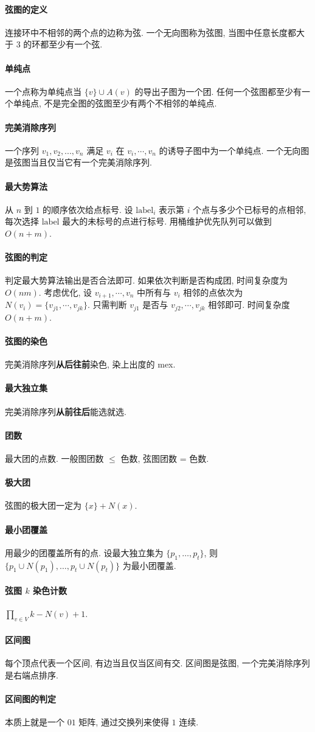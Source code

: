 \paragraph{弦图的定义}连接环中不相邻的两个点的边称为弦. 一个无向图称为弦图, 当图中任意长度都大于 $3$ 的环都至少有一个弦.
\paragraph{单纯点}一个点称为单纯点当 $\{v\}\cup A(v)$ 的导出子图为一个团. 任何一个弦图都至少有一个单纯点, 不是完全图的弦图至少有两个不相邻的单纯点. 
\paragraph{完美消除序列}一个序列 ${v_1,v_2,...,v_n}$ 满足 $v_i$ 在 ${v_i,\cdots,v_n}$ 的诱导子图中为一个单纯点.
一个无向图是弦图当且仅当它有一个完美消除序列.
\paragraph{最大势算法} 从 $n$ 到 $1$ 的顺序依次给点标号. 设 $\mathrm{label}_i$ 表示第 $i$ 个点与多少个已标号的点相邻, 每次选择 $\mathrm{label}$ 最大的未标号的点进行标号. 用桶维护优先队列可以做到 $O(n + m)$. 
\paragraph{弦图的判定} 判定最大势算法输出是否合法即可. 如果依次判断是否构成团, 时间复杂度为 $O(nm)$.
考虑优化, 设 ${v_{i+1},\cdots,v_n}$ 中所有与 $v_i$ 相邻的点依次为 $N(v_i) = \{v_{j1},\cdots,v_{jk}\}$. 
只需判断 $v_{j1}$ 是否与 $v_{j2},\cdots,v_{jk}$ 相邻即可. 时间复杂度$O(n+m)$.
\paragraph{弦图的染色} 完美消除序列\textbf{从后往前}染色, 染上出度的 mex.
\paragraph{最大独立集} 完美消除序列\textbf{从前往后}能选就选.
\paragraph{团数} 最大团的点数. 一般图团数 $\leq$ 色数, 弦图团数 = 色数. 
\paragraph{极大团} 弦图的极大团一定为 $\{x\} + N(x)$.
\paragraph{最小团覆盖} 用最少的团覆盖所有的点. 设最大独立集为 $\{p_1, \dots ,p_t\}$, 
则 $\{p_1\cup N(p_1), \dots , p_t \cup N(p_t)\}$ 为最小团覆盖.
\paragraph{弦图 $k$ 染色计数} $\prod_{v\in V} k - N(v) + 1$.
\paragraph{区间图} 每个顶点代表一个区间, 有边当且仅当区间有交. 区间图是弦图, 一个完美消除序列是右端点排序.
\paragraph{区间图的判定} 本质上就是一个 $01$ 矩阵, 通过交换列来使得 $1$ 连续.